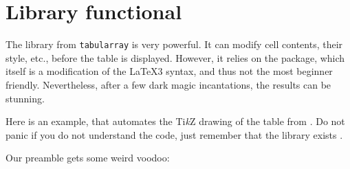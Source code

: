 \chapter{Library functional}\label{app:functional}

The  library from \texttt{tabularray} is very powerful. It can modify cell contents, their style, etc., before the table is displayed. However, it relies on the  package, which itself is a modification of the \LaTeX3 syntax, and thus not the most beginner friendly. Nevertheless, after a few dark magic incantations, the results can be stunning. 

Here is an example, that automates the Ti\emph{k}Z drawing of the table from . Do not panic if you do not understand the code, just remember that the library exists . 

Our preamble gets some weird voodoo:


